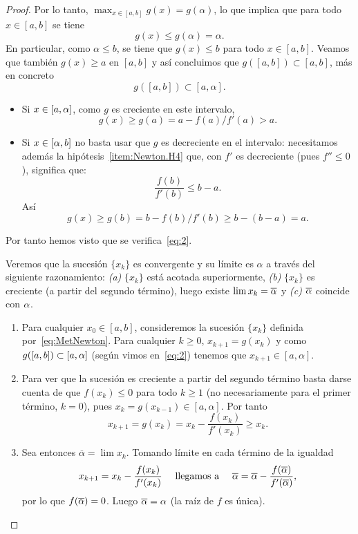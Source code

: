\begin{proof}
  Por lo tanto, $\max_{x\in [a,b]} g(x)=g(\alpha)$, lo que implica que
  para todo
  $x\in [a,b]$ se tiene
  $$
  g(x)\le g(\alpha)=\alpha.
  $$
  En particular, como $\alpha\le b$, se tiene que $g(x)\le b$ para
  todo $x\in [a,b]$. Veamos que también $g(x)\ge a$ en $[a,b]$ y así
  concluimos que $g([a,b]) \subset [a,b]$, más en concreto
  \begin{equation}
    g([a,b])\subset [a,\alpha].\label{eq:2}
  \end{equation}

  \begin{itemize}
  \item Si $x\in [a,\alpha]$, como $g$ es creciente en este intervalo,
    $$g(x)\ge  g(a) = a-f(a)/f'(a) > a.$$
  \item Si $x\in [\alpha,b]$ no basta usar que $g$ es
    decreciente en el intervalo: necesitamos además la
    hipótesis~\ref{item:Newton.H4} que,
    con $f'$ es decreciente (pues $f''\le 0$), significa que:
    \begin{equation}
      \frac{f(b)}{f'(b)} \le b-a.
      \label{eq:Newton.H4.simplificada}
    \end{equation}
    Así
    $$g(x) \ge g(b)=b-f(b)/f'(b) \ge b-(b-a)=a.$$
  \end{itemize}
  Por tanto hemos visto que se verifica~\eqref{eq:2}.

  Veremos que la sucesión $\{x_k\}$ es convergente y su límite es
  $\alpha$ a través del siguiente razonamiento: \textit{(a)} $\{x_k\}$
  está acotada superiormente, \textit{(b)} $\{x_k\}$ es creciente (a
  partir del segundo término), luego existe $\lim x_k=\overline{\alpha}$
  y \textit{(c)} $\overline{\alpha}$ coincide con $\alpha$.
  \begin{enumerate}[label=\emph{(\alph*)}]
  \item Para cualquier $x_0\in[a,b]$, consideremos la sucesión
    $\{x_k\}$ definida por~\eqref{eq:MetNewton}. Para cualquier $k\ge
    0$, $x_{k+1}=g(x_{k})$ y como $g([a,b])\subset [a,\alpha]$
    (según vimos en~\eqref{eq:2}) tenemos que
    $x_{k+1}\in [a,\alpha]$.
  \item Para ver que la sucesión es creciente a partir del segundo
    término basta darse cuenta de que $f(x_k)\le 0$ para todo $k\ge 1$
    (no necesariamente para el primer término, $k=0$), pues $x_k=g(x_{k-1})\in
    [a,\alpha]$. Por tanto
    $$
    x_{k+1}=g(x_k)=x_k - \frac{f(x_k)}{f'(x_k)} \ge x_k.
    $$
  \item Sea entonces $\overline\alpha = \lim x_k$. Tomando límite en cada
    término de la igualdad
    \begin{equation*}
      x_{k+1}=x_k- \frac{f(x_k)}{f'(x_k)}
      \quad\text{ llegamos a }\quad
      \overline{\alpha} = \overline{\alpha} -
      \frac{f(\overline{\alpha})}{f'(\overline{\alpha})},
    \end{equation*}
    por lo que $f(\overline{\alpha})=0$. Luego $\overline{\alpha}=\alpha$ (la
    raíz de $f$ es única).
  \end{enumerate}


\end{proof}
